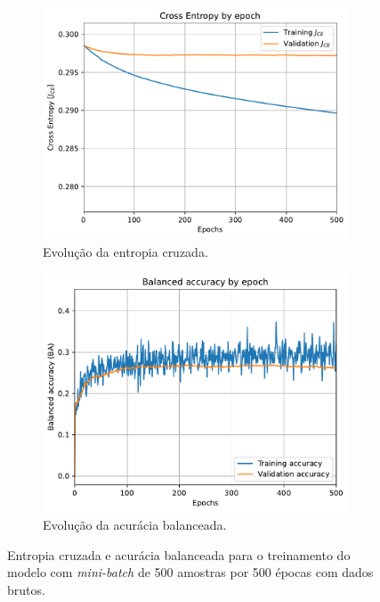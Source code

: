 \begin{figure}[H]
	\begin{subfigure}[H]{0.49\textwidth}
		\centering
		\includegraphics[width = \linewidth]{../../plot/LR_2/CE_500_epochs_batch_size500}
		\caption{Evolução da entropia cruzada.}
		\label{fig:CE_500_epochs_batch_size500_raw}
	\end{subfigure}
	\begin{subfigure}[H]{0.49\textwidth}
		\centering
		\includegraphics[width = \linewidth]{../../plot/LR_2/BA_500_epochs_batch_size500}
		\caption{Evolução da acurácia balanceada.}
		\label{fig:BA_500_epochs_batch_size500_raw}
	\end{subfigure}
	\caption{Entropia cruzada e acurácia balanceada para o treinamento do modelo com \textit{mini-batch} de 500 amostras por 500 épocas com dados brutos.}
	\label{fig:CE_BA_raw}
\end{figure}

